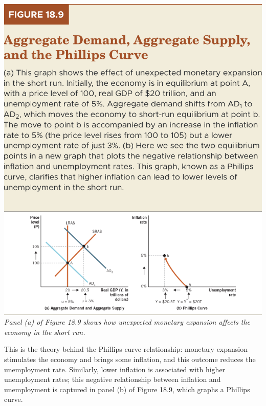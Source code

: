 \documentclass[11pt]{article} %
\begin{document}
\begin{center}
\includegraphics[scale=0.5]{images/Figure 18.9.png}\\
\textit{Panel (a) of Figure 18.9 shows how unexpected monetary expansion affects the economy in the short run.}
\end{center}
This is the theory behind the Phillips curve relationship: monetary expansion stimulates the economy and brings some inflation, and this outcome reduces the unemployment rate. Similarly, lower inflation is associated with higher unemployment rates; this negative relationship between inflation and unemployment is captured in panel (b) of Figure 18.9, which graphs a Phillips curve.
\end{document}
